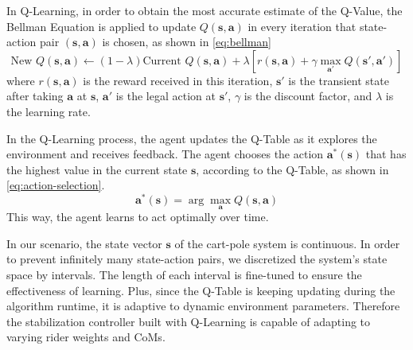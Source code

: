 \documentclass[10pt,a4paper]{article}
\begin{document}
In Q-Learning, in order to obtain the most accurate estimate of the Q-Value,  the Bellman Equation is applied to update $Q(\boldsymbol{s}, \boldsymbol{a})$ in every iteration that state-action pair $(\boldsymbol{s}, \boldsymbol{a})$ is chosen, as shown in \eqref{eq:bellman}
\begin{equation}
	\text{New~} Q(\boldsymbol{s}, \boldsymbol{a}) \leftarrow (1-\lambda)\text{Current~} Q(\boldsymbol{s}, \boldsymbol{a}) + \lambda \left[ r(\boldsymbol{s}, \boldsymbol{a}) + \gamma \max_{\boldsymbol{a'}}Q(\boldsymbol{s'}, \boldsymbol{a'})\right]
	\label{eq:bellman}
\end{equation}
where $r(\boldsymbol{s}, \boldsymbol{a})$ is the reward received in this iteration, $\boldsymbol{s'}$ is the transient state after taking $\boldsymbol{a}$ at $\boldsymbol{s}$, $\boldsymbol{a'}$ is the legal action at $\boldsymbol{s'}$, $\gamma$ is the discount factor, and $\lambda$ is the learning rate. 

In the Q-Learning process, the agent updates the Q-Table as it explores the environment and receives feedback. The agent chooses the action $\boldsymbol{a}^{*}(\boldsymbol{s})$ that has the highest value in the current state $\boldsymbol{s}$, according to the Q-Table, as shown in \eqref{eq:action-selection}.  
\begin{equation}
	\boldsymbol{a}^{*}(\boldsymbol{s}) = \arg\max_{\boldsymbol{a}}Q(\boldsymbol{s}, \boldsymbol{a})
	\label{eq:action-selection}
\end{equation}
This way, the agent learns to act optimally over time.

In our scenario, the state vector $\boldsymbol{s}$ of the cart-pole system is continuous. In order to prevent infinitely many state-action pairs, we discretized the system's state space by intervals. The length of each interval is fine-tuned to ensure the effectiveness of learning. Plus, since the Q-Table is keeping updating during the algorithm runtime, it is adaptive to dynamic environment parameters. Therefore the stabilization controller built with Q-Learning is capable of adapting to varying rider weights and CoMs.
\end{document}
